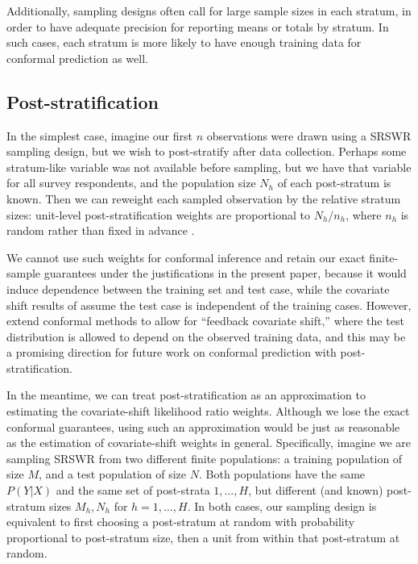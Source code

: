 \documentclass[10.5pt, letterpaper]{article}
\numberwithin{table}{section}
\numberwithin{figure}{section}
\numberwithin{equation}{section}
\begin{document}
Additionally, sampling designs often call for large sample sizes in each stratum, in order to have adequate precision for reporting means or totals by stratum. In such cases, each stratum is more likely to have enough training data for conformal prediction as well.


\subsection{Post-stratification}\label{sec:Poststrat}

In the simplest case, imagine our first $n$ observations were drawn using a SRSWR sampling design, but we wish to post-stratify after data collection. Perhaps some stratum-like variable was not available before sampling, but we have that variable for all survey respondents, and the population size $N_h$ of each post-stratum is known. Then we can reweight each sampled observation by the relative stratum sizes: unit-level post-stratification weights are proportional to $N_h/n_h$, where $n_h$ is random rather than fixed in advance \citep{lohr2021sampling}.

We cannot use such weights for conformal inference and retain our exact finite-sample guarantees under the justifications in the present paper, because it would induce dependence between the training set and test case, while the covariate shift results of \cite{tibshirani2019conformal} assume the test case is independent of the training cases. However, \cite{fannjiang2022conformal} extend conformal methods to allow for ``feedback covariate shift,'' where the test distribution is allowed to depend on the observed training data, and this may be a promising direction for future work on conformal prediction with post-stratification.

In the meantime, we can treat post-stratification as an approximation to estimating the covariate-shift likelihood ratio weights. Although we lose the exact conformal guarantees, using such an approximation would be just as reasonable as the estimation of covariate-shift weights in general. Specifically, imagine we are sampling SRSWR from two different finite populations: a training population of size $M$, and a test population of size $N$. Both populations have the same $P(Y|X)$ and the same set of post-strata $1,\ldots,H$, but different (and known) post-stratum sizes $M_h,N_h$ for $h=1,\ldots,H$. In both cases, our sampling design is equivalent to first choosing a post-stratum at random with probability proportional to post-stratum size, then a unit from within that post-stratum at random.
\end{document}
